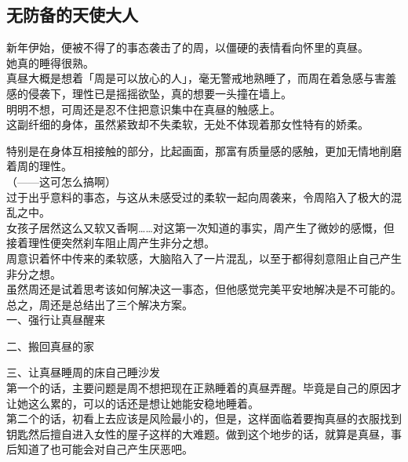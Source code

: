 \subsection{无防备的天使大人}

新年伊始，便被不得了的事态袭击了的周，以僵硬的表情看向怀里的真昼。\\

她真的睡得很熟。\\

真昼大概是想着「周是可以放心的人」，毫无警戒地熟睡了，而周在着急感与害羞感的侵袭下，理性已是摇摇欲坠，真的想要一头撞在墙上。\\

明明不想，可周还是忍不住把意识集中在真昼的触感上。\\

这副纤细的身体，虽然紧致却不失柔软，无处不体现着那女性特有的娇柔。

特别是在身体互相接触的部分，比起画面，那富有质量感的感触，更加无情地削磨着周的理性。\\

（——这可怎么搞啊）\\

过于出乎意料的事态，与这从未感受过的柔软一起向周袭来，令周陷入了极大的混乱之中。\\

女孩子居然这么又软又香啊……对这第一次知道的事实，周产生了微妙的感慨，但接着理性便突然刹车阻止周产生非分之想。\\

周意识着怀中传来的柔软感，大脑陷入了一片混乱，以至于都得刻意阻止自己产生非分之想。\\

虽然周还是试着思考该如何解决这一事态，但他感觉完美平安地解决是不可能的。\\

总之，周还是总结出了三个解决方案。\\

一、强行让真昼醒来

二、搬回真昼的家

三、让真昼睡周的床自己睡沙发\\

第一个的话，主要问题是周不想把现在正熟睡着的真昼弄醒。毕竟是自己的原因才让她这么累的，可以的话还是想让她能安稳地睡着。\\

第二个的话，初看上去应该是风险最小的，但是，这样面临着要掏真昼的衣服找到钥匙然后擅自进入女性的屋子这样的大难题。做到这个地步的话，就算是真昼，事后知道了也可能会对自己产生厌恶吧。\\

